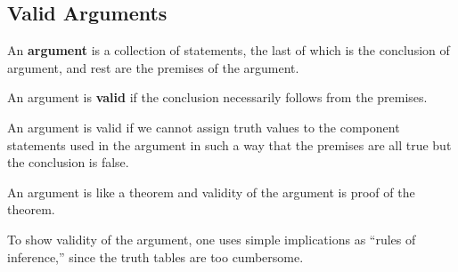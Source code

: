 \documentclass[]{article}
\begin{document}
\subsection{Valid Arguments}
\begin{defn}[Argument] An \textbf{argument} is a collection of statements, the last of which is the conclusion of argument, and rest are the premises of the argument.
\end{defn}
\begin{defn}[Validity] An argument is \textbf{valid} if the conclusion necessarily follows from the premises.
\end{defn}
\begin{rem} An argument is valid if we cannot assign truth values to the component statements used in the argument in such a way that the premises are all true but the conclusion is false.
\end{rem}
\begin{rem} An argument is like a theorem and validity of the argument is proof of the theorem.
\end{rem}
\begin{rem} To show validity of the argument, one uses simple implications as ``rules of inference,'' since the truth tables are too cumbersome.
\end{rem}
\end{document}
